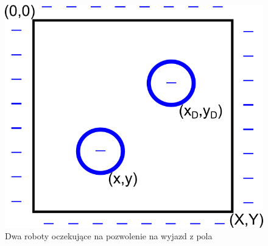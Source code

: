 	\begin{figure}[H]
		\centering
		\includegraphics[scale=0.9]{img/tworobots.png}
		\caption{Dwa roboty oczekujące na pozwolenie na wyjazd z pola}
		\label{pic:tworobots}
	\end{figure}
